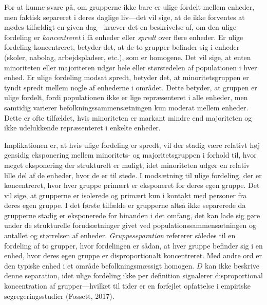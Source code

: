 \documentclass[
]{book}
\begin{document}
For at kunne svare på, om grupperne ikke bare er ulige fordelt mellem enheder, men faktisk separeret i deres daglige liv---det vil sige, at de ikke forventes at mødes tilfældigt en given dag---kræver det en beskrivelse af, om den ulige fordeling er \emph{koncentreret} i få enheder eller \emph{spredt} over flere enheder. Er ulige fordeling koncentreret, betyder det, at de to grupper befinder sig i enheder (skoler, nabolag, arbejdspladser, etc.), som er homogene. Det vil sige, at enten minoriteten eller majoriteten udgør hele eller størstedelen af populationen i hver enhed. Er ulige fordeling modsat spredt, betyder det, at minoritetsgruppen er tyndt spredt mellem nogle af enhederne i området. Dette betyder, at gruppen er ulige fordelt, fordi populationen ikke er lige repræsenteret i alle enheder, men samtidig varierer befolkningssammensætningen kun moderat mellem enheder. Dette er ofte tilfældet, hvis minoriteten er markant mindre end majoriteten og ikke udelukkende repræsenteret i enkelte enheder.

Implikationen er, at hvis ulige fordeling er spredt, vil der stadig være relativt høj gensidig eksponering mellem minoritets- og majoritetsgruppen i forhold til, hvor meget eksponering der strukturelt er muligt, idet minoriteten udgør en relativ lille del af de enheder, hvor de er til stede. I modsætning til ulige fordeling, der er koncentreret, hvor hver gruppe primært er eksponeret for deres egen gruppe. Det vil sige, at grupperne er isolerede og primært kun i kontakt med personer fra deres egen gruppe. I det første tilfælde er grupperne altså ikke separerede da grupperne stadig er eksponerede for hinanden i det omfang, det kan lade sig gøre under de strukturelle forudsætninger givet ved populationssammensætningen og antallet og størrelsen af enheder. \emph{Gruppeseparation} refererer således til en fordeling af to grupper, hvor fordelingen er sådan, at hver gruppe befinder sig i en enhed, hvor deres egen gruppe er disproportionalt koncentreret. Med andre ord er den typiske enhed i et område befolkningsmæssigt homogen. \(D\) kan ikke beskrive denne separation, idet ulige fordeling ikke per definition signalerer disproportional koncentration af grupper---hvilket til tider er en forfejlet opfattelse i empiriske segregeringsstudier (Fossett, 2017).
\end{document}
